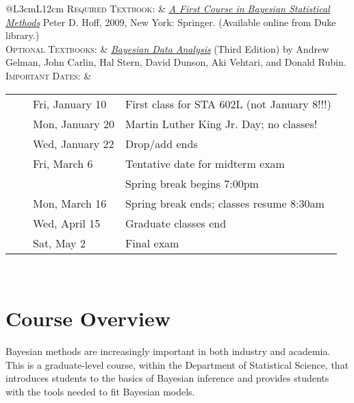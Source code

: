 \documentclass[11pt, a4paper]{article}
\newcommand{\tabitem}{~~\llap{\textbullet}~~}
\begin{document}
\begin{center}
\begin{minipage}[t]{.9\textwidth}
\begin{tabular}{@{}L{3cm}L{12cm}}
\textsc{Required Textbook:} & \href{https://www.amazon.com/Bayesian-Statistical-Methods-Springer-Statistics/dp/0387922997}{\textit{A First Course in Bayesian Statistical Methods}} Peter D. Hoff, 2009, New York: Springer. (Available online from Duke library.)\\
\textsc{Optional Textbooks:}	& \href{http://www.amazon.com/Bayesian-Analysis-Chapman-Statistical-Science/dp/1439840954/}{\textit{Bayesian Data Analysis}} (Third Edition) by Andrew Gelman, John Carlin, Hal Stern, David Dunson, Aki Vehtari, and Donald Rubin. \\
\textsc{Important Dates:} & \begin{minipage}[t]{.9\textwidth}
													\begin{tabular}{@{}ll}
														\tabitem Fri, January 10 & First class for STA 602L (not January 8!!!) \\
														\tabitem Mon, January 20 & Martin Luther King Jr. Day; no classes! \\
														\tabitem Wed, January 22 & Drop/add ends \\
														\tabitem Fri, March 6 & Tentative date for midterm exam \\
																							  & Spring break begins 7:00pm \\
														\tabitem Mon, March 16 & Spring break ends; classes resume 8:30am \\
														\tabitem Wed, April 15 & Graduate classes end \\
														\tabitem Sat, May 2 & Final exam \\
													\end{tabular}
													\end{minipage} \\
	 \bottomrule[0.065cm]
\end{tabular}
\end{minipage}
\end{center}





\vspace{.5cm}
\setlength{\unitlength}{1in}
\renewcommand{\arraystretch}{1.5}



\section{Course Overview}
Bayesian methods are increasingly important in both industry and academia. This is a graduate-level course, within the Department of Statistical Science, that introduces students to the basics of Bayesian inference and provides students with the tools needed to fit Bayesian models. 
\end{document}
